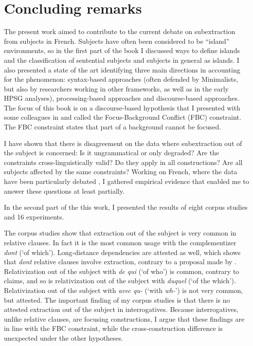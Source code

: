 \chapter{Concluding remarks}
The present work aimed to contribute to the current debate on subextraction from subjects in French. Subjects have often been considered to be ``island'' environments, so in the first part of the book I discussed ways to define islands and the classification of sentential subjects and subjects in general as islands. I also presented a state of the art identifying three main directions in accounting for the phenomenon: syntax-based approaches (often defended by Minimalists, but also by researchers working in other frameworks, as well as in the early HPSG analyses), processing-based approaches and discourse-based approaches. The focus of this book is on a discourse-based hypothesis that I presented with some colleagues in \citet{Abeille.2020.Cognition} and called the Focus-Background Conflict (FBC) constraint. The FBC constraint states that part of a background cannot be focused. 

I have shown that there is disagreement on the data where subextraction out of the subject is concerned: Is it ungrammatical or only degraded? Are the constraints cross-linguistically valid? Do they apply in all constructions? Are all subjects affected by the same constraints? Working on French, where the data have been particularly debated \citep[a.o.][]{Godard.1988,Tellier.1991,Heck.2009}, I gathered empirical evidence that enabled me to answer these questions at least partially.

In the second part of the this work, I presented the results of eight corpus studies and 16 experiments. 

The corpus studies show that extraction out of the subject is very common in relative clauses. In fact it is the most common usage with the complementizer \emph{dont} (`of which'). Long-distance dependencies are attested as well, which shows that \emph{dont} relative clauses involve extraction, contrary to a proposal made by \citet{Heck.2009}. Relativization out of the subject with \emph{de qui} (`of who') is common, contrary to  claims, and so is relativization out of the subject with \emph{duquel} (`of the which'). Relativization out of the subject with \emph{avec qu-} (`with \textit{wh-}') is not very common, but attested. The important finding of my corpus studies is that there is no attested extraction out of the subject in interrogatives. Because interrogatives, unlike relative clauses, are focusing constructions, I argue that these findings are in line with the FBC constraint, while the cross-construction difference is unexpected under the other hypotheses.

